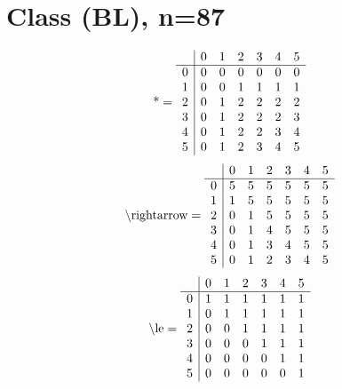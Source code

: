 \documentclass[11pt]{article}
\begin{document}
\section{Class (BL), n=87}
\[\text{*} = 
\begin{array}{r | r r r r r r}
 & 0 & 1 & 2 & 3 & 4 & 5 \\ \hline
0 & 0 & 0 & 0 & 0 & 0 & 0 \\
1 & 0 & 0 & 1 & 1 & 1 & 1 \\
2 & 0 & 1 & 2 & 2 & 2 & 2 \\
3 & 0 & 1 & 2 & 2 & 2 & 3 \\
4 & 0 & 1 & 2 & 2 & 3 & 4 \\
5 & 0 & 1 & 2 & 3 & 4 & 5 \\
\end{array}
\]
\[\text{\textbackslash rightarrow} = 
\begin{array}{r | r r r r r r}
 & 0 & 1 & 2 & 3 & 4 & 5 \\ \hline
0 & 5 & 5 & 5 & 5 & 5 & 5 \\
1 & 1 & 5 & 5 & 5 & 5 & 5 \\
2 & 0 & 1 & 5 & 5 & 5 & 5 \\
3 & 0 & 1 & 4 & 5 & 5 & 5 \\
4 & 0 & 1 & 3 & 4 & 5 & 5 \\
5 & 0 & 1 & 2 & 3 & 4 & 5 \\
\end{array}
\]
\[\text{\textbackslash le} = 
\begin{array}{r | r r r r r r}
 & 0 & 1 & 2 & 3 & 4 & 5 \\ \hline
0 & 1 & 1 & 1 & 1 & 1 & 1 \\
1 & 0 & 1 & 1 & 1 & 1 & 1 \\
2 & 0 & 0 & 1 & 1 & 1 & 1 \\
3 & 0 & 0 & 0 & 1 & 1 & 1 \\
4 & 0 & 0 & 0 & 0 & 1 & 1 \\
5 & 0 & 0 & 0 & 0 & 0 & 1 \\
\end{array}
\]
\end{document}
